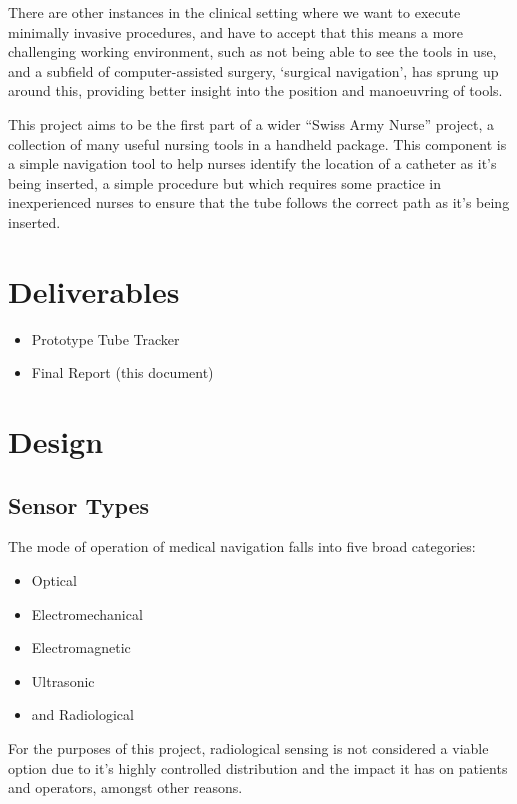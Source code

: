 \documentclass[a4paper]{article}
\begin{document}
    There are other instances in the clinical setting where we want to execute minimally invasive procedures, and have to accept that this means a more challenging working environment, such as not being able to see the tools in use, and a subfield of computer-assisted surgery, `surgical navigation', has sprung up around this, providing better insight into the position and manoeuvring of tools.

    This project aims to be the first part of a wider ``Swiss Army Nurse'' project, a collection of many useful nursing tools in a handheld package. This component is a simple navigation tool to help nurses identify the location of a catheter as it's being inserted, a simple procedure but which requires some practice in inexperienced nurses to ensure that the tube follows the correct path as it's being inserted.

    \section{Deliverables}
    \begin{itemize}
        \item Prototype Tube Tracker
        \item Final Report (this document)
    \end{itemize}

    \section{Design}
        \subsection{Sensor Types}
        The mode of operation of medical navigation falls into five broad categories:
        \begin{itemize}
            \item Optical
            \item Electromechanical
            \item Electromagnetic
            \item Ultrasonic
            \item and Radiological
        \end{itemize}
        For the purposes of this project, radiological sensing is not considered a viable option due to it's highly controlled distribution and the impact it has on patients and operators, amongst other reasons.
\end{document}

